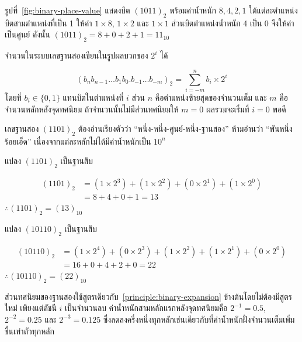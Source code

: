รูปที่~\ref{fig:binary-place-value} แสดงบิต $(1011)_2$ พร้อมค่าน้ำหนัก $8,4,2,1$ ใต้แต่ละตำแหน่ง บิตสามตำแหน่งที่เป็น 1 ให้ค่า $1\times8$, $1\times2$ และ $1\times1$ ส่วนบิตตำแหน่งน้ำหนัก 4 เป็น 0 จึงให้ค่าเป็นศูนย์ ดังนั้น $(1011)_2=8+0+2+1=11_{10}$

\begin{principle}
\label{principle:binary-expansion}
จำนวนในระบบเลขฐานสองเขียนในรูปผลบวกของ $2^i$ ได้

$$(b_n b_{n-1} \ldots b_1 b_0 . b_{-1} \ldots b_{-m})_2 = \sum_{i=-m}^{n} b_i \times 2^i$$
โดยที่ $b_i \in \{0, 1\}$ แทนบิตในตำแหน่งที่ $i$ ส่วน $n$ คือตำแหน่งซ้ายสุดของจำนวนเต็ม และ $m$ คือจำนวนหลักหลังจุดทศนิยม ถ้าจำนวนนั้นไม่มีส่วนทศนิยมให้ $m = 0$ ผลรวมจะเริ่มที่ $i = 0$ พอดี
\end{principle}

\begin{warning}
\label{rem:binary-reading}
เลขฐานสอง $(1101)_2$ ต้องอ่านเรียงตัวว่า ``หนึ่ง-หนึ่ง-ศูนย์-หนึ่ง-ฐานสอง'' ห้ามอ่านว่า ``พันหนึ่งร้อยเอ็ด'' เนื่องจากแต่ละหลักไม่ได้มีค่าน้ำหนักเป็น $10^n$
\end{warning}

\begin{ex}
\label{ex:bin-to-dec-1101}
แปลง $(1101)_2$ เป็นฐานสิบ
\end{ex}
\begin{solution}
\begin{align*}
(1101)_2 &= (1\times2^3)+(1\times2^2)+(0\times2^1)+(1\times2^0)\\
&= 8 + 4 + 0 + 1 = 13
\end{align*}
$\therefore (1101)_2 = (13)_{10}$ \solhere
\end{solution}

\begin{ex}
\label{ex:bin-to-dec-10110}
แปลง $(10110)_2$ เป็นฐานสิบ
\end{ex}
\begin{solution}
\begin{align*}
(10110)_2 &= (1\times2^4)+(0\times2^3)+(1\times2^2)+(1\times2^1)+(0\times2^0)\\
&= 16 + 0 + 4 + 2 + 0 = 22
\end{align*}
$\therefore (10110)_2 = (22)_{10}$ \solhere
\end{solution}

ส่วนทศนิยมของฐานสองใช้สูตรเดียวกับ~\autoref{principle:binary-expansion} ข้างต้นโดยไม่ต้องมีสูตรใหม่ เพียงแต่ดัชนี $i$ เป็นจำนวนลบ ค่าน้ำหนักสามหลักแรกหลังจุดทศนิยมคือ $2^{-1} = 0.5$, $2^{-2} = 0.25$ และ $2^{-3} = 0.125$ ซึ่งลดลงครึ่งหนึ่งทุกหลักเช่นเดียวกับที่ค่าน้ำหนักฝั่งจำนวนเต็มเพิ่มขึ้นเท่าตัวทุกหลัก


